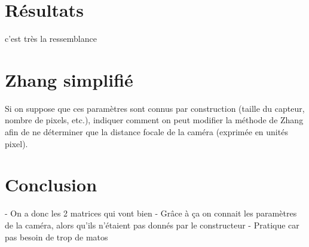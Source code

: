 \documentclass{article}
\begin{document}

\section{Résultats}

c'est très la ressemblance


\section{Zhang simplifié}

Si on suppose que ces paramètres sont connus par construction (taille du capteur, nombre de pixels, etc.), indiquer comment on peut modifier la méthode de Zhang afin de ne déterminer que la distance focale de la caméra (exprimée en unités pixel).




\section{Conclusion}

- On a donc les 2 matrices qui vont bien
- Grâce à ça on connait les paramètres de la caméra, alors qu'ils n'étaient pas donnés par le constructeur
- Pratique car pas besoin de trop de matos

\end{document}
